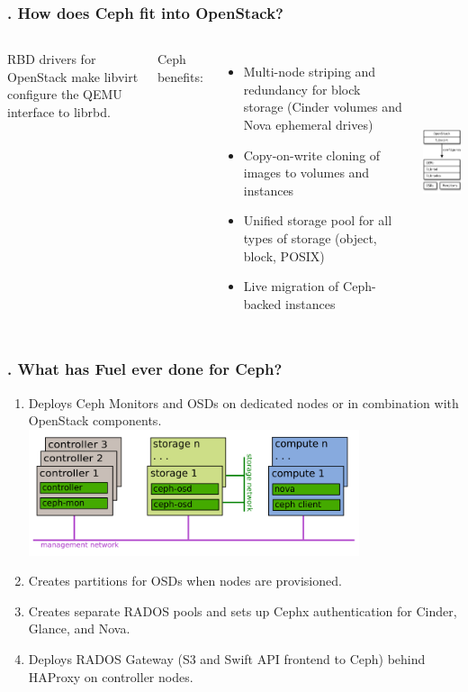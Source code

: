\documentclass[hyperref=unicode,utf8,xcolor=pst]{beamer}
\begin{document}
\begin{frame}
	\frametitle{\insertframenumber{}. How does Ceph fit into
	OpenStack?}
	\begin{columns}
		RBD drivers for OpenStack make libvirt configure the
		QEMU interface to librbd.

		\vspace{2ex}
		Ceph benefits:
		\begin{itemize}
			\item Multi-node striping and redundancy for
				block storage (Cinder volumes and Nova
				ephemeral drives)
			\item Copy-on-write cloning of images to
				volumes and instances
			\item Unified storage pool for all types of
				storage (object, block, POSIX)
			\item Live migration of Ceph-backed instances
		\end{itemize}

		\includegraphics[height=6.5cm]{ceph-rbd-openstack}
	\end{columns}
\end{frame}

\begin{frame}
	\frametitle{\insertframenumber{}. What has Fuel ever done for Ceph?}

	\begin{enumerate}
		\item Deploys Ceph Monitors and OSDs on dedicated nodes
			or in combination with OpenStack components.\\
			\includegraphics[height=3.7cm]{openstack-nodes}
		\item Creates partitions for OSDs when nodes are
			provisioned.
		\item Creates separate RADOS pools and sets up Cephx
			authentication for Cinder, Glance, and Nova.
		\item Deploys RADOS Gateway (S3 and Swift API frontend
			to Ceph) behind HAProxy on controller nodes.
	\end{enumerate}
\end{frame}
\end{document}
